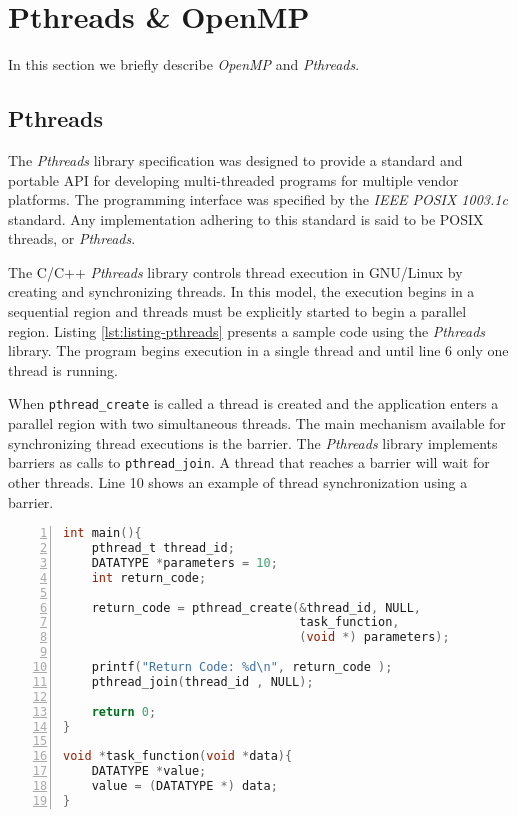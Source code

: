 \section{Pthreads \& OpenMP}
\label{sec:apis}

In this section we briefly describe \textit{OpenMP} and \textit{Pthreads}.

\subsection{Pthreads}

The \textit{Pthreads} library specification was designed to provide a standard
and portable API for developing multi-threaded programs for multiple vendor
platforms.  The programming interface was specified by the \textit{IEEE POSIX
1003.1c} standard. Any implementation adhering to this standard is said to be
POSIX threads, or \textit{Pthreads}.

The C/C++ \textit{Pthreads} library controls thread execution in GNU/Linux by
creating and synchronizing threads. In this model, the execution begins in a
sequential region and threads must be explicitly started to begin
a parallel region.
Listing \ref{lst:listing-pthreads} presents a sample code using the
\textit{Pthreads} library. The program begins execution in a
single thread and until line 6 only one thread is running.

When \texttt{pthread\_create} is called a thread is created and the application
enters a parallel region with two simultaneous threads.  The main mechanism
available for synchronizing thread executions is the barrier. The
\textit{Pthreads} library implements barriers as calls to
\texttt{pthread\_join}. A thread that reaches a barrier will wait for other
threads. Line 10 shows an example of thread synchronization using a barrier.

\begin{lstlisting}[language=C, basicstyle=\ttfamily\scriptsize, numbers=left,
                   frame=no, showspaces=false, showstringspaces=false,
                   caption={\textit{Pthreads} Sample Program}, captionpos=b,
                   numberstyle=\tiny,
                   xleftmargin=0.5cm,
                   label=lst:listing-pthreads, keywords={%
                       DATATYPE, pthread_t, pthread_create,
                       pthread_join, task_function, NULL, int, main,
                       void, printf, return%
                       },
                   otherkeywords={::, \#pragma, \#include, <<<,>>>, \&, \*, +, -, /, [, ], >, <}
                   ]
int main(){
    pthread_t thread_id;
    DATATYPE *parameters = 10;
    int return_code;

    return_code = pthread_create(&thread_id, NULL,
                                 task_function,
                                 (void *) parameters);

    printf("Return Code: %d\n", return_code );
    pthread_join(thread_id , NULL);

    return 0;
}

void *task_function(void *data){
    DATATYPE *value;
    value = (DATATYPE *) data;
}
\end{lstlisting}

